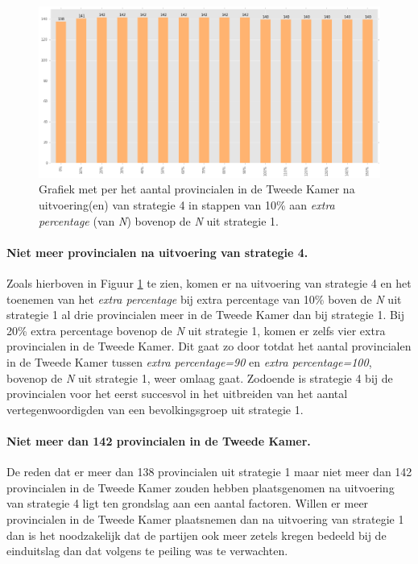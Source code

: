 \begin{figure}[H]

	\includegraphics[width=\linewidth]	{topNextrapercentage_aantal_provincialen_overzicht.png}

			\caption{Grafiek met per het aantal provincialen in de Tweede Kamer na uitvoering(en) van strategie 4 in stappen van 10\% aan \textit{extra percentage} (van \textit{N}) bovenop de \textit{N} uit strategie 1.}

\label{fig:bcS4P}
\end{figure}

\paragraph{Niet meer provincialen na uitvoering van strategie 4.}
Zoals hierboven in Figuur \ref{fig:bcS4P} te zien, komen er na uitvoering van strategie 4 en het toenemen van het \textit{extra percentage} bij extra percentage van 10\% boven de \textit{N} uit strategie 1 al drie provincialen meer in de Tweede Kamer dan bij strategie 1. Bij 20\% extra percentage bovenop de \textit{N} uit strategie 1, komen er zelfs vier extra provincialen in de Tweede Kamer. Dit gaat zo door totdat het aantal provincialen in de Tweede Kamer tussen \textit{extra percentage=90} en \textit{extra percentage=100}, bovenop de \textit{N} uit strategie 1, weer omlaag gaat. Zodoende is strategie 4 bij de provincialen voor het eerst succesvol in het uitbreiden van het aantal vertegenwoordigden van een bevolkingsgroep uit strategie 1.


\paragraph{Niet meer dan 142 provincialen in de Tweede Kamer.}
De reden dat er meer dan 138 provincialen uit strategie 1 maar niet meer dan 142 provincialen in de Tweede Kamer zouden hebben plaatsgenomen na uitvoering van strategie 4 ligt ten grondslag aan een aantal factoren. Willen er meer provincialen in de Tweede Kamer plaatsnemen dan na uitvoering van strategie 1 dan is het noodzakelijk dat de partijen ook meer zetels kregen bedeeld bij de einduitslag dan dat volgens te peiling was te verwachten. 

